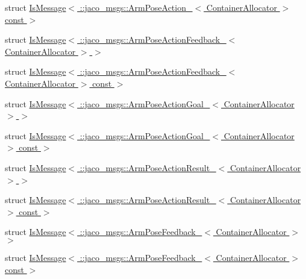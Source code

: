 \begin{DoxyCompactItemize}
\item 
struct \hyperlink{structros_1_1message__traits_1_1IsMessage_3_01_1_1jaco__msgs_1_1ArmPoseAction___3_01ContainerAllocator_01_4_01const_01_01_4}{Is\+Message$<$ \+::jaco\+\_\+msgs\+::\+Arm\+Pose\+Action\+\_\+$<$ Container\+Allocator $>$ const  $>$}
\item 
struct \hyperlink{structros_1_1message__traits_1_1IsMessage_3_01_1_1jaco__msgs_1_1ArmPoseActionFeedback___3_01ContainerAllocator_01_4_01_4}{Is\+Message$<$ \+::jaco\+\_\+msgs\+::\+Arm\+Pose\+Action\+Feedback\+\_\+$<$ Container\+Allocator $>$ $>$}
\item 
struct \hyperlink{structros_1_1message__traits_1_1IsMessage_3_01_1_1jaco__msgs_1_1ArmPoseActionFeedback___3_01Contab9f6081b53195b19a83d5e6bc9decf6}{Is\+Message$<$ \+::jaco\+\_\+msgs\+::\+Arm\+Pose\+Action\+Feedback\+\_\+$<$ Container\+Allocator $>$ const  $>$}
\item 
struct \hyperlink{structros_1_1message__traits_1_1IsMessage_3_01_1_1jaco__msgs_1_1ArmPoseActionGoal___3_01ContainerAllocator_01_4_01_4}{Is\+Message$<$ \+::jaco\+\_\+msgs\+::\+Arm\+Pose\+Action\+Goal\+\_\+$<$ Container\+Allocator $>$ $>$}
\item 
struct \hyperlink{structros_1_1message__traits_1_1IsMessage_3_01_1_1jaco__msgs_1_1ArmPoseActionGoal___3_01ContainerAllocator_01_4_01const_01_01_4}{Is\+Message$<$ \+::jaco\+\_\+msgs\+::\+Arm\+Pose\+Action\+Goal\+\_\+$<$ Container\+Allocator $>$ const  $>$}
\item 
struct \hyperlink{structros_1_1message__traits_1_1IsMessage_3_01_1_1jaco__msgs_1_1ArmPoseActionResult___3_01ContainerAllocator_01_4_01_4}{Is\+Message$<$ \+::jaco\+\_\+msgs\+::\+Arm\+Pose\+Action\+Result\+\_\+$<$ Container\+Allocator $>$ $>$}
\item 
struct \hyperlink{structros_1_1message__traits_1_1IsMessage_3_01_1_1jaco__msgs_1_1ArmPoseActionResult___3_01Contai9deb2f6cd31487e5a1b1987c9c9cbbee}{Is\+Message$<$ \+::jaco\+\_\+msgs\+::\+Arm\+Pose\+Action\+Result\+\_\+$<$ Container\+Allocator $>$ const  $>$}
\item 
struct \hyperlink{structros_1_1message__traits_1_1IsMessage_3_01_1_1jaco__msgs_1_1ArmPoseFeedback___3_01ContainerAllocator_01_4_01_4}{Is\+Message$<$ \+::jaco\+\_\+msgs\+::\+Arm\+Pose\+Feedback\+\_\+$<$ Container\+Allocator $>$ $>$}
\item 
struct \hyperlink{structros_1_1message__traits_1_1IsMessage_3_01_1_1jaco__msgs_1_1ArmPoseFeedback___3_01ContainerAllocator_01_4_01const_01_01_4}{Is\+Message$<$ \+::jaco\+\_\+msgs\+::\+Arm\+Pose\+Feedback\+\_\+$<$ Container\+Allocator $>$ const  $>$}

\end{DoxyCompactItemize}
